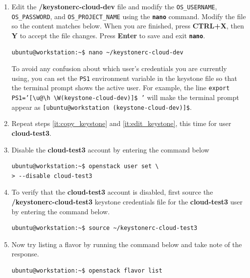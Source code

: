 \documentclass[letterpaper, 12pt]{article}
\begin{document}
\begin{enumerate}
    \item Edit the \textbf{\texttildemid/keystonerc-cloud-dev} file and modify the \texttt{OS\_USERNAME}, \texttt{OS\_PASSWORD}, and
    \texttt{OS\_PROJECT\_NAME} using the \textbf{\texttt{nano}} command. Modify the file so the content matches below.
    When you are finished, press \textbf{CTRL+X}, then \textbf{Y} to accept the file changes. Press \textbf{Enter} to
    save and exit \textbf{\texttt{nano}}.
    \label{it:edit_keystone}
\begin{lstlisting}
ubuntu@workstation:~$ nano ~/keystonerc-cloud-dev
\end{lstlisting}

    \begin{tipbox}{}
        To avoid any confusion about which user's credentials you are currently using, you can set the \texttt{PS1}
        environment variable in the keystone file so that the terminal prompt shows the active user. For example, the
        line \texttt{export PS1='[\textbackslash u@\textbackslash h \textbackslash W(keystone-cloud-dev)]\$ '} will
        make the terminal prompt appear as \texttt{[ubuntu@workstation \texttildemid(keystone-cloud-dev)]\$}.
    \end{tipbox}

    \item Repeat steps \ref{it:copy_keystone} and \ref{it:edit_keystone}, this time for user \textbf{cloud-test3}.
    
    \item Disable the \textbf{cloud-test3} account by entering the command below
\begin{lstlisting}
ubuntu@workstation:~$ openstack user set \
> --disable cloud-test3
\end{lstlisting}

    \item To verify that the \textbf{cloud-test3} account is disabled, first source the
    \textbf{\texttildemid/keystonerc-cloud-test3} keystone credentials file for the \textbf{cloud-test3} user by
    entering the command below.
\begin{lstlisting}
ubuntu@workstation:~$ source ~/keystonerc-cloud-test3
\end{lstlisting}

    \item Now try listing a flavor by running the command below and take note of the response.
\begin{lstlisting}
ubuntu@workstation:~$ openstack flavor list
\end{lstlisting}


\end{enumerate}
\end{document}
